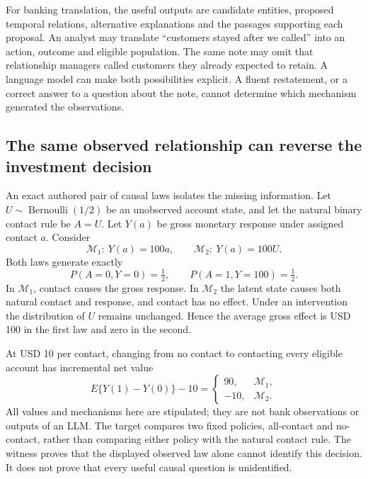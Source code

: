 For banking translation, the useful outputs are candidate entities, proposed
temporal relations, alternative explanations and the passages supporting each
proposal. An analyst may translate ``customers stayed after we called'' into
an action, outcome and eligible population. The same note may omit that
relationship managers called customers they already expected to retain. A
language model can make both possibilities explicit. A fluent restatement,
or a correct answer to a question about the note, cannot determine which
mechanism generated the observations.

\subsection{The same observed relationship can reverse the investment decision}
\label{exec23:context-twins}

An exact authored pair of causal laws isolates the missing information. Let
$U\sim\operatorname{Bernoulli}(1/2)$ be an unobserved account state, and let the
natural binary contact rule be $A=U$. Let $Y(a)$ be gross monetary response
under assigned contact $a$. Consider
\begin{equation}
 \mathcal M_1:\ Y(a)=100a,
 \qquad
 \mathcal M_2:\ Y(a)=100U.
 \label{exec23:context-laws}
\end{equation}
Both laws generate exactly
\begin{equation}
 P(A=0,Y=0)=\tfrac12,
 \qquad P(A=1,Y=100)=\tfrac12.
 \label{exec23:context-observed}
\end{equation}
In $\mathcal M_1$, contact causes the gross response. In $\mathcal M_2$ the
latent state causes both natural contact and response, and contact has no
effect. Under an intervention the distribution of $U$ remains unchanged.
Hence the average gross effect is USD 100 in the first law and zero in the
second.~\citep{exec23_context_reference}

At USD 10 per contact, changing from no contact to contacting every eligible
account has incremental net value
\begin{equation}
 E\{Y(1)-Y(0)\}-10=
 \begin{cases}
 90,&\mathcal M_1,\\
 -10,&\mathcal M_2.
 \end{cases}
 \label{exec23:context-net}
\end{equation}
All values and mechanisms here are stipulated; they are not bank observations
or outputs of an LLM. The target compares two fixed policies, all-contact and
no-contact, rather than comparing either policy with the natural contact rule.
The witness proves that the displayed observed law alone cannot identify this
decision. It does not prove that every useful causal question is unidentified.

